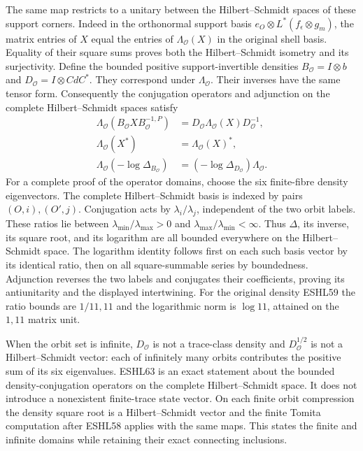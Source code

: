 \documentclass[
  10pt,
  a4paper,
]{article}
\newcounter{none} %
\begin{document}
The same map restricts to a unitary between the Hilbert--Schmidt spaces
of these support corners. Indeed in the orthonormal support basis
\(e_O\otimes L^*(f_\epsilon\otimes g_m)\), the matrix entries of \(X\)
equal the entries of \(\Lambda_{\mathcal O}(X)\) in the original shell
basis. Equality of their square sums proves both the Hilbert--Schmidt
isometry and its surjectivity. Define the bounded positive
support-invertible densities \(B_{\mathcal O}=I\otimes b\) and
\(D_{\mathcal O}=I\otimes CdC^*\). They correspond under
\(\Lambda_{\mathcal O}\). Their inverses have the same tensor form.
Consequently the conjugation operators and adjunction on the complete
Hilbert--Schmidt spaces satisfy \[
\begin{aligned}
\Lambda_{\mathcal O}(B_{\mathcal O}XB_{\mathcal O}^{-1,P})
&=D_{\mathcal O}\Lambda_{\mathcal O}(X)D_{\mathcal O}^{-1},\\
\Lambda_{\mathcal O}(X^*)&=\Lambda_{\mathcal O}(X)^*,\\
\Lambda_{\mathcal O}(-\log\Delta_{B_{\mathcal O}})
&=(-\log\Delta_{D_{\mathcal O}})\Lambda_{\mathcal O}.
\end{aligned}
\tag{ESHL63}
\] For a complete proof of the operator domains, choose the six
finite-fibre density eigenvectors. The complete Hilbert--Schmidt basis
is indexed by pairs \((O,i),(O',j)\). Conjugation acts by
\(\lambda_i/\lambda_j\), independent of the two orbit labels. These
ratios lie between \(\lambda_{\min}/\lambda_{\max}>0\) and
\(\lambda_{\max}/\lambda_{\min}<\infty\). Thus \(\Delta\), its inverse,
its square root, and its logarithm are all bounded everywhere on the
Hilbert--Schmidt space. The logarithm identity follows first on each
such basis vector by its identical ratio, then on all square-summable
series by boundedness. Adjunction reverses the two labels and conjugates
their coefficients, proving its antiunitarity and the displayed
intertwining. For the original density ESHL59 the ratio bounds are
\(1/11,11\) and the logarithmic norm is \(\log11\), attained on the
\(1,11\) matrix unit.

When the orbit set is infinite, \(D_{\mathcal O}\) is not a trace-class
density and \(D_{\mathcal O}^{1/2}\) is not a Hilbert--Schmidt vector:
each of infinitely many orbits contributes the positive sum of its six
eigenvalues. ESHL63 is an exact statement about the bounded
density-conjugation operators on the complete Hilbert--Schmidt space. It
does not introduce a nonexistent finite-trace state vector. On each
finite orbit compression the density square root is a Hilbert--Schmidt
vector and the finite Tomita computation after ESHL58 applies with the
same maps. This states the finite and infinite domains while retaining
their exact connecting inclusions.
\end{document}
